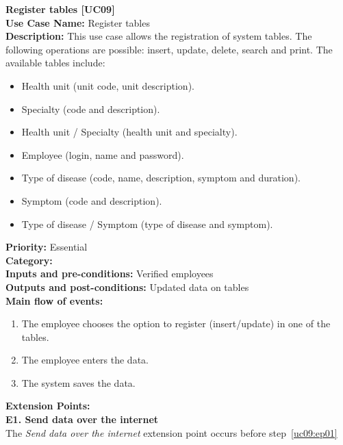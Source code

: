\documentclass[11pt,twoside]{article}
\begin{document}
\textbf{Register tables [UC09]}\\
\textbf{Use Case Name:} Register tables\\
\textbf{Description:} This use case allows the registration of system tables. The following operations are possible: insert, update, delete,
search and print. The available tables include:\\
\begin{itemize}
\item Health unit (unit code, unit description).
\item Specialty (code and description).
\item Health unit / Specialty (health unit and specialty).
\item Employee (login, name and password).
\item Type of disease (code, name, description, symptom and duration).
\item Symptom (code and description).
\item Type of disease / Symptom (type of disease and symptom).
\end{itemize}
\textbf{Priority:} Essential\\
\textbf{Category:} \\
\textbf{Inputs and pre-conditions:} Verified employees\\
\textbf{Outputs and post-conditions:} Updated data on tables\\
\textbf{Main flow of events:}\\
\begin{enumerate}
\item The employee chooses the option to register (insert/update) in one of the tables.
\item The employee enters the data.
\item\label{uc09:ep01} The system saves the data.
\end{enumerate}


\textbf{Extension Points:}\\
\textbf{E1. Send data over the internet}\\
The \textit{Send data over the internet} extension point occurs before step~\ref{uc09:ep01}
\end{document}
